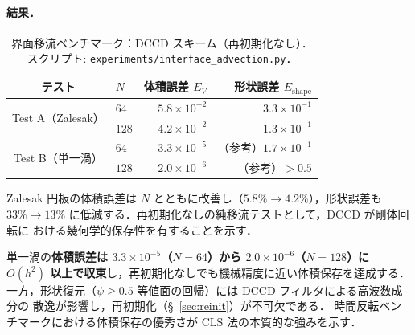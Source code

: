 \paragraph{結果．}

\begin{table}[htbp]
\centering
\caption{界面移流ベンチマーク：DCCD スキーム（再初期化なし）．
  スクリプト: \texttt{experiments/interface\_advection.py}．}
\label{tab:interface_advection}
\begin{tabular}{c l r r}
\toprule
テスト & $N$ & 体積誤差 $E_V$ & 形状誤差 $E_\text{shape}$ \\
\midrule
\multirow{2}{*}{Test A（Zalesak）}
  & $64$  & $5.8\times10^{-2}$ & $3.3\times10^{-1}$ \\
  & $128$ & $4.2\times10^{-2}$ & $1.3\times10^{-1}$ \\
\midrule
\multirow{2}{*}{Test B（単一渦）}
  & $64$  & $3.3\times10^{-5}$ & （参考）$1.7\times10^{-1}$ \\
  & $128$ & $2.0\times10^{-6}$ & （参考）$> 0.5$ \\
\bottomrule
\end{tabular}
\end{table}

\begin{tcolorbox}[resultbox, title={Test A 結果：Zalesak スロット円板}]
Zalesak 円板の体積誤差は $N$ とともに改善し（$5.8\% \to 4.2\%$），形状誤差も
$33\% \to 13\%$ に低減する．再初期化なしの純移流テストとして，DCCD が剛体回転に
おける幾何学的保存性を有することを示す．
\end{tcolorbox}

\begin{tcolorbox}[resultbox, title={Test B 結果：単一渦（体積保存）}]
単一渦の\textbf{体積誤差は $3.3\times10^{-5}$（$N=64$）から $2.0\times10^{-6}$（$N=128$）に
$O(h^2)$ 以上で収束}し，再初期化なしでも機械精度に近い体積保存を達成する．
一方，形状復元（$\psi\geq 0.5$ 等値面の回帰）には DCCD フィルタによる高波数成分の
散逸が影響し，再初期化（§~\ref{sec:reinit}）が不可欠である．
時間反転ベンチマークにおける体積保存の優秀さが CLS 法の本質的な強みを示す．
\end{tcolorbox}
